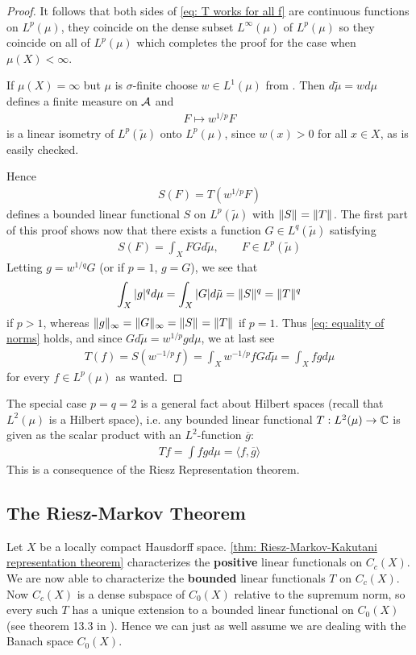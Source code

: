 \documentclass[../../main.tex]{subfiles}
\begin{document}
\begin{proof}
It follows that both sides of \eqref{eq: T works for all f} are continuous functions on $L^{p}(\mu)$, they coincide on the dense subset $L^{\infty}(\mu)$ of $L^{p}(\mu)$ so they coincide on all of $L^{p}(\mu)$ which completes the proof for the case when $\mu(X)<\infty$.

If $\mu(X)=\infty$ but $\mu$ is $\sigma$-finite choose $w\in L^{1}(\mu)$ from . Then $d\tilde{\mu}=wd\mu$ defines a finite measure on $\m{A}$ and
\begin{align*}
	F\mapsto w^{1/p}F
\end{align*}
is a linear isometry of $L^{p}(\tilde{\mu})$ onto $L^{p}(\mu)$, since $w(x)>0$ for all $x\in X$, as is easily checked.

Hence
\begin{align*}
	S(F)=T(w^{1/p}F)
\end{align*}
defines a bounded linear functional $S$ on $L^{p}(\tilde{\mu})$ with $\norm{S}=\norm{T}$.
The first part of this proof shows now that there exists a function $G\in L^{q}(\tilde{\mu})$ satisfying
\begin{align*}
	S(F)=\int_{X}FGd\tilde{\mu}, \qquad F\in L^{p}(\tilde{\mu})
\end{align*}
Letting $g=w^{1/q}G$ (or if $p=1$, $g=G$), we see that
\begin{align*}
	\int_{X}|g|^{q}d\mu=\int_{X}|G|d\tilde{\mu}=\norm{S}^{q}=\norm{T}^{q}
\end{align*} 
if $p>1$, whereas $\norm[\infty]{g}=\norm[\infty]{G}=\norm{S}=\norm{T}$ if $p=1$. Thus \eqref{eq: equality of norms} holds, and since $Gd\tilde{\mu}=w^{1/p}gd\mu$, we at last see
\begin{align*}
	T(f)=S(w^{-1/p}f)=\int_{X}w^{-1/p}fGd\tilde{\mu}=\int_{X}fgd\mu
\end{align*}
for every $f\in L^{p}(\mu)$ as wanted.
\end{proof}

The special case $p=q=2$ is a general fact about Hilbert spaces (recall that $L^{2}(\mu)$ is a Hilbert space), i.e. any bounded linear functional $T:L^{2}(\mu)\to \C$ is given as the scalar product with an $L^{2}$-function $\overline{g}$:
\begin{align*}
	Tf=\int fg d\mu=\langle f,\overline{g} \rangle
\end{align*}
This is a consequence of the Riesz Representation theorem.

\subsection{The Riesz-Markov Theorem}
Let $X$ be a locally compact Hausdorff space. \cref{thm: Riesz-Markov-Kakutani representation theorem} characterizes the \textbf{positive} linear functionals on $C_{c}(X)$. We are now able to characterize the \textbf{bounded} linear functionals $T$ on $C_{c}(X)$. Now $C_{c}(X)$ is a dense subspace of $C_{0}(X)$ relative to the supremum norm, so every such $T$ has a unique extension to a bounded linear functional on $C_{0}(X)$ (see theorem 13.3 in \cite{Musat17}). Hence we can just as well assume we are dealing with the Banach space $C_{0}(X)$.
\end{document}
